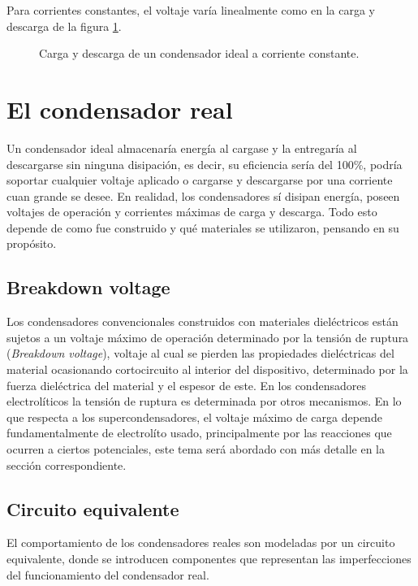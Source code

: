 Para corrientes constantes, el voltaje varía linealmente como en la carga y descarga de la figura \ref{fig:plot:charge-discharge_ideal_cap}.
\begin{figure}[h!]
	\caption{Carga y descarga de un condensador ideal a corriente constante.}
	\label{fig:plot:charge-discharge_ideal_cap}
\end{figure}

\section{El condensador real}
Un condensador ideal almacenaría energía al cargase y la entregaría al descargarse sin ninguna disipación, es decir, su eficiencia sería del 100\%, podría soportar cualquier voltaje aplicado o cargarse y descargarse por una corriente cuan grande se desee.  En realidad, los condensadores sí disipan energía, poseen voltajes de operación y corrientes máximas de carga y descarga. Todo esto depende de como fue construido y qué materiales se utilizaron, pensando en su propósito.

\subsection{Breakdown voltage}
Los condensadores convencionales construidos con materiales dieléctricos están sujetos a un voltaje máximo de operación determinado por la tensión de ruptura (\textit{Breakdown voltage}), voltaje al cual se pierden las propiedades dieléctricas del material ocasionando cortocircuito al interior del dispositivo, determinado por la fuerza dieléctrica del material y el espesor de este. En los condensadores electrolíticos la tensión de ruptura es determinada por otros mecanismos\cite{Yahalom1971}. En lo que respecta a los supercondensadores, el voltaje máximo de carga depende fundamentalmente de electrolíto usado, principalmente por las reacciones que ocurren a ciertos potenciales, este tema será abordado con más detalle en la sección correspondiente.

\subsection{Circuito equivalente}
El comportamiento de los condensadores reales son modeladas por un circuito equivalente, donde se introducen componentes que representan las imperfecciones del funcionamiento del condensador real.\\

